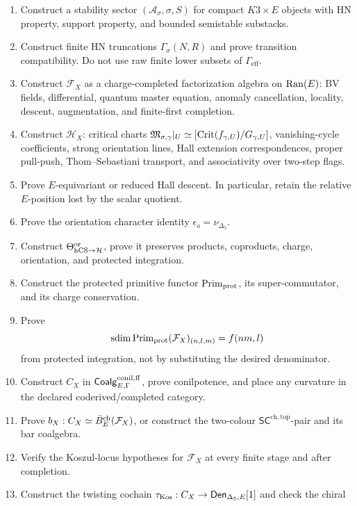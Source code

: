 \begin{enumerate}
\item Construct a stability sector \((\mathcal A_\sigma,\sigma,S)\) for
compact \(K3\times E\) objects with HN property, support property, and
bounded semistable substacks.
\item Construct finite HN truncations \(\Gamma_\sigma(N,R)\) and prove
transition compatibility.  Do not use raw finite lower subsets of
\(\Gamma_{\mathrm{eff}}\).
\item Construct \(\mathcal F_X\) as a charge-completed factorization
algebra on \(\operatorname{Ran}(E)\): BV fields, differential, quantum master
equation, anomaly cancellation, locality, descent, augmentation, and
finite-first completion.
\item Construct \(\mathcal H_X\): critical charts
\(\mathfrak M_{\sigma,\gamma}|_U\simeq[\operatorname{Crit}(f_{\gamma,U})/G_{\gamma,U}]\),
vanishing-cycle coefficients, strong orientation lines, Hall extension
correspondences, proper pull-push, Thom--Sebastiani transport, and
associativity over two-step flags.
\item Prove \(E\)-equivariant or reduced Hall descent.  In particular,
retain the relative \(E\)-position lost by the scalar quotient.
\item Prove the orientation character identity
\(\epsilon_o=\nu_{\Delta_5}\).
\item Construct
\(\Theta^{\mathrm{or}}_{\mathrm{hCS}\to\mathcal H}\), prove it preserves products,
coproducts, charge, orientation, and protected integration.
\item Construct the protected primitive functor
\(\operatorname{Prim}_{\mathrm{prot}}\), its super-commutator, and its charge
conservation.
\item Prove
\[
\operatorname{sdim}\operatorname{Prim}_{\mathrm{prot}}(\mathcal F_X)_{(n,l,m)}=f(nm,l)
\]
from protected integration, not by substituting the desired
denominator.
\item Construct \(C_X\) in
\(\mathsf{Coalg}^{\mathrm{conil,ff}}_{E,\Gamma}\), prove conilpotence, and
place any curvature in the declared coderived/completed category.
\item Prove \(b_X:C_X\simeq\bar B_E^{\mathrm{ch}}(\mathcal F_X)\), or
construct the two-colour
\(\mathsf{SC}^{\mathrm{ch,top}}\)-pair and its bar coalgebra.
\item Verify the Koszul-locus hypotheses for \(\mathcal F_X\) at every
finite stage and after completion.
\item Construct the twisting cochain
\(\tau_{\mathrm{Kos}}:C_X\to\mathsf{Den}_{\Delta_5,E}[1]\) and check the chiral

\end{enumerate}
